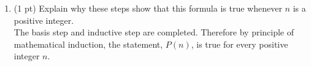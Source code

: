 \begin{questions}
\begin{solution}
\begin{enumerate}[label=(\alph*),itemsep=0pt,parsep=0pt,
    topsep=0pt,partopsep=0pt]
\begin{align*}
        &= k + k^2 +  2(k+1) \tag{IH} \\
        &= k^2 + k + 2k + 2 \\
        &= k^2 + 3k + 2 
      \end{align*}
      This shows $P(k+1)$ is true, assuming $P(k)$ is true, completing the inductive step.
  \item (1 pt) Explain why these steps show that this formula is true whenever $n$ is a positive integer. \\
    The basis step and inductive step are completed.  Therefore by principle of mathematical induction, the statement, $P(n)$, is true for every positive integer $n$.
\end{enumerate}
\end{solution}








\end{questions}
